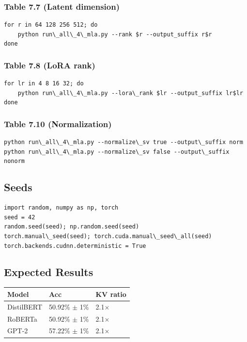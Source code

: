 \subsubsection{Table 7.7 (Latent dimension)}
\begin{lstlisting}
for r in 64 128 256 512; do
    python run\_all\_4\_mla.py --rank $r --output_suffix r$r
done
\end{lstlisting}

\subsubsection{Table 7.8 (LoRA rank)}
\begin{lstlisting}
for lr in 4 8 16 32; do
    python run\_all\_4\_mla.py --lora\_rank $lr --output_suffix lr$lr
done
\end{lstlisting}

\subsubsection{Table 7.10 (Normalization)}
\begin{lstlisting}
python run\_all\_4\_mla.py --normalize\_sv true --output\_suffix norm
python run\_all\_4\_mla.py --normalize\_sv false --output\_suffix nonorm
\end{lstlisting}

\subsection{Seeds}

\begin{lstlisting}
import random, numpy as np, torch
seed = 42
random.seed(seed); np.random.seed(seed)
torch.manual\_seed(seed); torch.cuda.manual\_seed\_all(seed)
torch.backends.cudnn.deterministic = True
\end{lstlisting}

\subsection{Expected Results}

\begin{table}[H]
\centering
\small
\begin{tabular}{lll}
\toprule
\textbf{Model} & \textbf{Acc} & \textbf{KV ratio} \\
\midrule
DistilBERT & 50.92\% $\pm$ 1\% & 2.1$\times$ \\
RoBERTa & 50.92\% $\pm$ 1\% & 2.1$\times$ \\
GPT-2 & 57.22\% $\pm$ 1\% & 2.1$\times$ \\
\bottomrule
\end{tabular}
\end{table}

